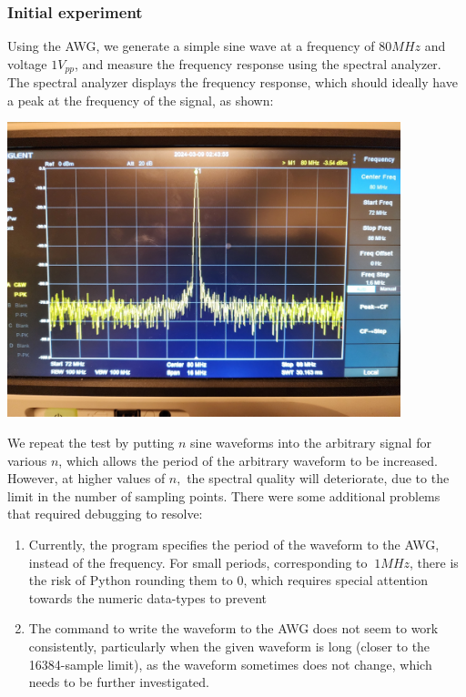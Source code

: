 \documentclass{article}
\begin{document}
    \subsubsection*{Initial experiment}
    Using the AWG, we generate a simple sine wave at a frequency of $80MHz$ and voltage $1V_{pp}$, and measure the frequency response using the spectral analyzer. The spectral analyzer displays the frequency response, which should ideally have a peak at the frequency of the signal, as shown:
    \begin{mdframed}[backgroundcolor=gray!20, align = center, userdefinedwidth = 4.8in]
    \includegraphics[width = 4.5in]{img/spectralAnalyzer.jpg}
    \end{mdframed}
    We repeat the test by putting $n$ sine waveforms into the arbitrary signal for various $n$, which allows the period of the arbitrary waveform to be increased. However, at higher values of $n,$ the spectral quality will deteriorate, due to the limit in the number of sampling points. There were some additional problems that required debugging to resolve:
    \begin{enumerate}
    \item Currently, the program specifies the period of the waveform to the AWG, instead of the frequency. For small periods, corresponding to $~1MHz$, there is the risk of Python rounding them to 0, which requires special attention towards the numeric data-types to prevent
    \item The command to write the waveform to the AWG does not seem to work consistently, particularly when the given waveform is long (closer to the 16384-sample limit), as the waveform sometimes does not change, which needs to be further investigated.
    \end{enumerate}
\end{document}
